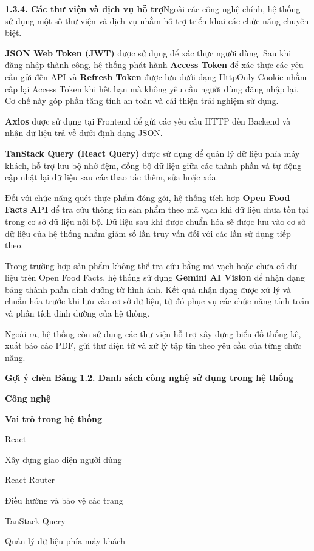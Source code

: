 \textbf{1.3.4. Các thư viện và dịch vụ hỗ trợ}Ngoài các công nghệ chính, hệ thống sử dụng một số thư viện và dịch vụ nhằm hỗ trợ triển khai các chức năng chuyên biệt.

\textbf{JSON Web Token (JWT)} được sử dụng để xác thực người dùng. Sau khi đăng nhập thành công, hệ thống phát hành \textbf{Access Token} để xác thực các yêu cầu gửi đến API và \textbf{Refresh Token} được lưu dưới dạng HttpOnly Cookie nhằm cấp lại Access Token khi hết hạn mà không yêu cầu người dùng đăng nhập lại. Cơ chế này góp phần tăng tính an toàn và cải thiện trải nghiệm sử dụng.

\textbf{Axios} được sử dụng tại Frontend để gửi các yêu cầu HTTP đến Backend và nhận dữ liệu trả về dưới định dạng JSON.

\textbf{TanStack Query (React Query)} được sử dụng để quản lý dữ liệu phía máy khách, hỗ trợ lưu bộ nhớ đệm, đồng bộ dữ liệu giữa các thành phần và tự động cập nhật lại dữ liệu sau các thao tác thêm, sửa hoặc xóa.

Đối với chức năng quét thực phẩm đóng gói, hệ thống tích hợp \textbf{Open Food Facts API} để tra cứu thông tin sản phẩm theo mã vạch khi dữ liệu chưa tồn tại trong cơ sở dữ liệu nội bộ. Dữ liệu sau khi được chuẩn hóa sẽ được lưu vào cơ sở dữ liệu của hệ thống nhằm giảm số lần truy vấn đối với các lần sử dụng tiếp theo.

Trong trường hợp sản phẩm không thể tra cứu bằng mã vạch hoặc chưa có dữ liệu trên Open Food Facts, hệ thống sử dụng \textbf{Gemini AI Vision} để nhận dạng bảng thành phần dinh dưỡng từ hình ảnh. Kết quả nhận dạng được xử lý và chuẩn hóa trước khi lưu vào cơ sở dữ liệu, từ đó phục vụ các chức năng tính toán và phân tích dinh dưỡng của hệ thống.

Ngoài ra, hệ thống còn sử dụng các thư viện hỗ trợ xây dựng biểu đồ thống kê, xuất báo cáo PDF, gửi thư điện tử và xử lý tập tin theo yêu cầu của từng chức năng.

\textbf{Gợi ý chèn Bảng 1.2. Danh sách công nghệ sử dụng trong hệ thống}

\textbf{Công nghệ}

\textbf{Vai trò trong hệ thống}

React

Xây dựng giao diện người dùng

React Router

Điều hướng và bảo vệ các trang

TanStack Query

Quản lý dữ liệu phía máy khách

